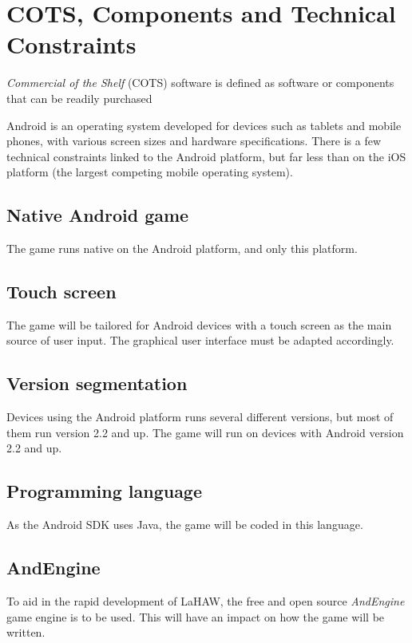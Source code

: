 \chapter{COTS, Components and Technical Constraints}
\emph{Commercial of the Shelf} (COTS) software is defined as software or components that can be readily purchased\cite{pensum}

Android is an operating system developed for devices such as tablets and mobile phones, with various screen sizes and hardware specifications. There is a few technical constraints linked to the Android platform, but far less than on the iOS platform (the largest competing mobile operating system). 

\section{Native Android game}
The game runs native on the Android platform, and only this platform.

\section{Touch screen}
The game will be tailored for Android devices with a touch screen as the main source of user input. The graphical user interface must be adapted accordingly. 

\section{Version segmentation}
Devices using the Android platform runs several different versions, but most of them run version 2.2 and up.\cite{androidversions} The game will run on devices with Android version 2.2 and up.

\section{Programming language}
As the Android SDK\cite{androidsdk} uses Java, the game will be coded in this language.

\section{AndEngine}
To aid in the rapid development of LaHAW, the free and open source \emph{AndEngine} game engine is to be used. This will have an impact on how the game will be written.